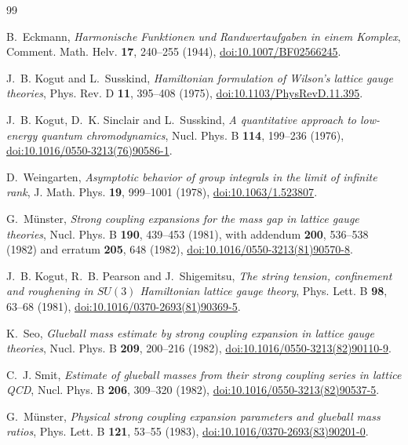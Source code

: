 \documentclass[11pt]{article}
\theoremstyle{plain}
\theoremstyle{definition}
\theoremstyle{remark}
\begin{document}
\begin{thebibliography}{99}\small\sloppy\raggedright

 B.~Eckmann,
  \emph{Harmonische Funktionen und Randwertaufgaben in einem Komplex},
  Comment. Math. Helv. \textbf{17}, 240--255 (1944),
  \href{https://doi.org/10.1007/BF02566245}{doi:10.1007/BF02566245}.

 J.~B. Kogut and L.~Susskind,
  \emph{Hamiltonian formulation of Wilson's lattice gauge theories},
  Phys. Rev. D \textbf{11}, 395--408 (1975),
  \href{https://doi.org/10.1103/PhysRevD.11.395}{doi:10.1103/PhysRevD.11.395}.

 J.~B. Kogut, D.~K. Sinclair and L.~Susskind,
  \emph{A quantitative approach to low-energy quantum chromodynamics},
  Nucl. Phys. B \textbf{114}, 199--236 (1976),
  \href{https://doi.org/10.1016/0550-3213(76)90586-1}{doi:10.1016/0550-3213(76)90586-1}.

 D.~Weingarten,
  \emph{Asymptotic behavior of group integrals in the limit of infinite rank},
  J. Math. Phys. \textbf{19}, 999--1001 (1978),
  \href{https://doi.org/10.1063/1.523807}{doi:10.1063/1.523807}.

 G.~M\"unster,
  \emph{Strong coupling expansions for the mass gap in lattice gauge theories},
  Nucl. Phys. B \textbf{190}, 439--453 (1981), with addendum
  \textbf{200}, 536--538 (1982) and erratum \textbf{205}, 648 (1982),
  \href{https://doi.org/10.1016/0550-3213(81)90570-8}{doi:10.1016/0550-3213(81)90570-8}.

 J.~B. Kogut, R.~B. Pearson and J.~Shigemitsu,
  \emph{The string tension, confinement and roughening in $SU(3)$ Hamiltonian
  lattice gauge theory}, Phys. Lett. B \textbf{98}, 63--68 (1981),
  \href{https://doi.org/10.1016/0370-2693(81)90369-5}{doi:10.1016/0370-2693(81)90369-5}.

 K.~Seo,
  \emph{Glueball mass estimate by strong coupling expansion in lattice gauge
  theories}, Nucl. Phys. B \textbf{209}, 200--216 (1982),
  \href{https://doi.org/10.1016/0550-3213(82)90110-9}{doi:10.1016/0550-3213(82)90110-9}.

 C.~J. Smit,
  \emph{Estimate of glueball masses from their strong coupling series in
  lattice QCD}, Nucl. Phys. B \textbf{206}, 309--320 (1982),
  \href{https://doi.org/10.1016/0550-3213(82)90537-5}{doi:10.1016/0550-3213(82)90537-5}.

 G.~M\"unster,
  \emph{Physical strong coupling expansion parameters and glueball mass
  ratios}, Phys. Lett. B \textbf{121}, 53--55 (1983),
  \href{https://doi.org/10.1016/0370-2693(83)90201-0}{doi:10.1016/0370-2693(83)90201-0}.


\end{thebibliography}
\end{document}
